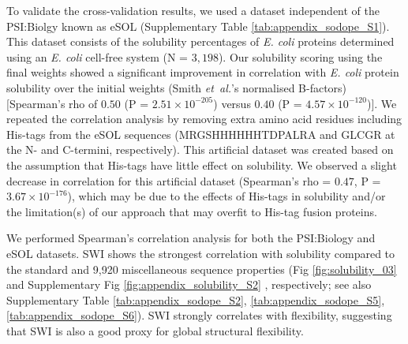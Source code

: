 To validate the cross-validation results, we used a dataset independent of the PSI:Biolgy known as eSOL \citep{Niwa2009-ye} (Supplementary Table \ref{tab:appendix_sodope_S1}). This dataset consists of the solubility percentages of \textit{E. coli} proteins determined using an \textit{E. coli} cell-free system (N = $3,198$). Our solubility scoring using the final weights showed a significant improvement in correlation with \textit{E. coli} protein solubility over the initial weights (Smith {\it et~al.}’s normalised B-factors) [Spearman’s rho of $0.50$ (P = $2.51 \times 10^{-205}$) versus $0.40$ (P = $4.57 \times 10^{-120}$)]. We repeated the correlation analysis by removing extra amino acid residues including His-tags from the eSOL sequences (MRGSHHHHHHTDPALRA and GLCGR at the N- and C-termini, respectively). This artificial dataset was created based on the assumption that His-tags have little effect on solubility. We observed a slight decrease in correlation for this artificial dataset (Spearman’s rho = $0.47$, P = $3.67 \times 10^{-176}$), which may be due to the effects of His-tags in solubility and/or the limitation(s) of our approach that may overfit to His-tag fusion proteins.

We performed Spearman’s correlation analysis for both the PSI:Biology and eSOL datasets. SWI shows the strongest correlation with solubility compared to the standard and 9,920 miscellaneous sequence properties (Fig \ref{fig:solubility_03} and Supplementary Fig \ref{fig:appendix_solubility_S2} , respectively; see also Supplementary Table \ref{tab:appendix_sodope_S2}, \ref{tab:appendix_sodope_S5}, \ref{tab:appendix_sodope_S6}). SWI strongly correlates with flexibility, suggesting that SWI is also a good proxy for global structural flexibility.



